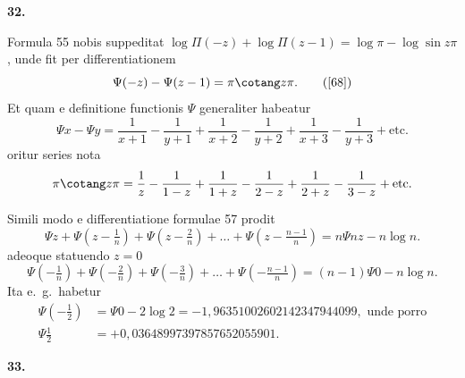 \documentclass[12pt,a4paper]{article}
\newcommand{\art}[1]{\par\medskip\noindent\textbf{#1.}\par\nopagebreak\smallskip}
\begin{document}
\art{32}

Formula 55 nobis suppeditat $\log\Pi(-z)+\log\Pi(z-1)=\log\pi-\log\sin z\pi$, unde fit per differentiationem
\begin{equation}
\Psi(-z) - \Psi(z-1) = \pi\cotang z\pi.\tag{[68]}
\end{equation}
Et quam e definitione functionis $\Psi$ generaliter habeatur
\begin{equation}
\Psi x - \Psi y = \frac{1}{x+1} - \frac{1}{y+1} + \frac{1}{x+2} - \frac{1}{y+2} + \frac{1}{x+3} - \frac{1}{y+3} + \text{etc.}\tag{[69]}
\end{equation}
oritur series nota
\[
\pi\cotang z\pi = \frac{1}{z} - \frac{1}{1-z} + \frac{1}{1+z} - \frac{1}{2-z} + \frac{1}{2+z} - \frac{1}{3-z} + \text{etc.}
\]

Simili modo e differentiatione formulae 57 prodit
\begin{equation}
\Psi z + \Psi(z-\tfrac{1}{n}) + \Psi(z-\tfrac{2}{n}) + \ldots + \Psi(z-\tfrac{n-1}{n}) = n\Psi nz - n\log n.\tag{[70]}
\end{equation}
adeoque statuendo $z=0$
\begin{equation}
\Psi(-\tfrac{1}{n}) + \Psi(-\tfrac{2}{n}) + \Psi(-\tfrac{3}{n}) + \ldots + \Psi(-\tfrac{n-1}{n}) = (n-1)\Psi0 - n\log n.\tag{[71]}
\end{equation}
Ita e.\ g.\ habetur
\begin{align*}
\Psi(-\tfrac{1}{2}) &= \Psi0 - 2\log2 = -1{,}96351002602142347944099,\text{ unde porro}\\
\Psi\tfrac{1}{2} &= +0{,}03648997397857652055901.
\end{align*}

\art{33}
\end{document}
